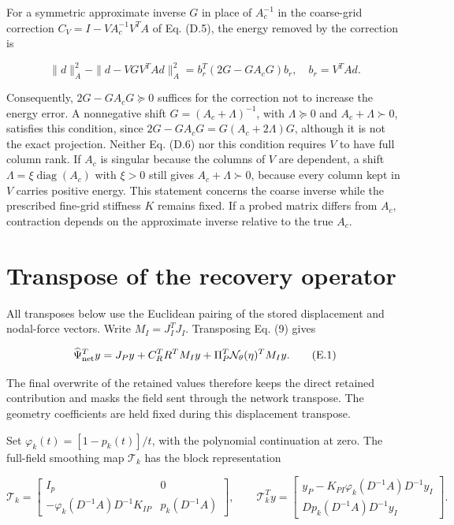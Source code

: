 \documentclass[preprint,12pt,authoryear]{elsarticle}
\begin{document}
For a symmetric approximate inverse \(G\) in place of \(A_c^{-1}\) in the coarse-grid correction \(C_V=I-VA_c^{-1}V^TA\) of Eq. (D.5), the energy removed by the correction is

\[
\|d\|_A^2-\|d-VGV^TAd\|_A^2
=b_r^T(2G-GA_cG)b_r,\quad b_r=V^TAd.
\tag{D.6}
\]

Consequently, \(2G-GA_cG\succeq0\) suffices for the correction not to increase the energy error. A nonnegative shift \(G=(A_c+\Lambda)^{-1}\), with \(\Lambda\succeq0\) and \(A_c+\Lambda\succ0\), satisfies this condition, since \(2G-GA_cG=G(A_c+2\Lambda)G\), although it is not the exact projection. Neither Eq. (D.6) nor this condition requires \(V\) to have full column rank. If \(A_c\) is singular because the columns of \(V\) are dependent, a shift \(\Lambda=\xi\operatorname{diag}(A_c)\) with \(\xi>0\) still gives \(A_c+\Lambda\succ0\), because every column kept in \(V\) carries positive energy. This statement concerns the coarse inverse while the prescribed fine-grid stiffness \(K\) remains fixed. If a probed matrix differs from \(A_c\), contraction depends on the approximate inverse relative to the true \(A_c\).

\section{Transpose of the recovery operator}

All transposes below use the Euclidean pairing of the stored displacement and nodal-force vectors. Write \(M_I=J_I^TJ_I\). Transposing Eq. (9) gives

\[
\widehat\Psi_{\rm net}^Ty=J_Py+C_R^TR^TM_Iy
 +\Pi_P^T\mathcal N_\theta(\eta)^TM_Iy.
\tag{E.1}
\]

The final overwrite of the retained values therefore keeps the direct retained contribution and masks the field sent through the network transpose. The geometry coefficients are held fixed during this displacement transpose.

Set \(\varphi_k(t)=[1-p_k(t)]/t\), with the polynomial continuation at zero. The full-field smoothing map \(\mathcal T_k\) has the block representation

\[
\mathcal T_k=
\begin{bmatrix}
I_p&0\\
-\varphi_k(D^{-1}A)D^{-1}K_{IP}&p_k(D^{-1}A)
\end{bmatrix},\qquad
\mathcal T_k^Ty=
\begin{bmatrix}
y_P-K_{PI}\varphi_k(D^{-1}A)D^{-1}y_I\\
D p_k(D^{-1}A)D^{-1}y_I
\end{bmatrix}.
\tag{E.2}
\]
\end{document}
